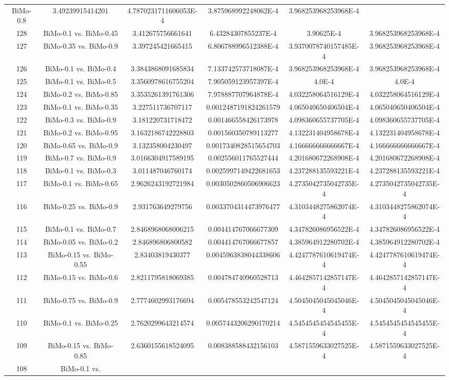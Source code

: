 \documentclass[a4paper,10pt]{article}
\begin{document}
\begin{landscape}
\begin{table}[!htp]
\begin{tabular}{cccccc}
BiMo-0.8&3.49239915414201&4.7870231711606053E-4&3.875968992248062E-4&3.968253968253968E-4\\128&BiMo-0.1 vs. BiMo-0.45&3.412675756661641&6.43284307855237E-4&3.90625E-4&3.968253968253968E-4\\127&BiMo-0.35 vs. BiMo-0.9&3.397245421665415&6.806788996512388E-4&3.9370078740157485E-4&3.968253968253968E-4\\126&BiMo-0.1 vs. BiMo-0.4&3.3843868091685834&7.133742573718087E-4&3.968253968253968E-4&3.968253968253968E-4\\125&BiMo-0.1 vs. BiMo-0.5&3.3560978616755204&7.905059123957397E-4&4.0E-4&4.0E-4\\124&BiMo-0.2 vs. BiMo-0.85&3.3535261391761306&7.978887707964878E-4&4.032258064516129E-4&4.032258064516129E-4\\123&BiMo-0.1 vs. BiMo-0.35&3.227511736707117&0.0012487191824261579&4.065040650406504E-4&4.065040650406504E-4\\122&BiMo-0.3 vs. BiMo-0.9&3.181220731718472&0.001466558426173978&4.098360655737705E-4&4.098360655737705E-4\\121&BiMo-0.2 vs. BiMo-0.95&3.1632186742228803&0.001560350789113277&4.132231404958678E-4&4.132231404958678E-4\\120&BiMo-0.65 vs. BiMo-0.9&3.132358004230497&0.0017340828515654703&4.166666666666667E-4&4.166666666666667E-4\\119&BiMo-0.7 vs. BiMo-0.9&3.0166304917589195&0.002556011765527444&4.201680672268908E-4&4.201680672268908E-4\\118&BiMo-0.1 vs. BiMo-0.3&3.011487046760174&0.0025997149422681653&4.237288135593221E-4&4.237288135593221E-4\\117&BiMo-0.1 vs. BiMo-0.65&2.9626243192721984&0.0030502860506906623&4.2735042735042735E-4&4.2735042735042735E-4\\116&BiMo-0.25 vs. BiMo-0.9&2.931763649279756&0.0033704314473976477&4.3103448275862074E-4&4.3103448275862074E-4\\115&BiMo-0.1 vs. BiMo-0.7&2.8468968068006215&0.004414767066677309&4.347826086956522E-4&4.347826086956522E-4\\114&BiMo-0.05 vs. BiMo-0.2&2.846896806800582&0.004414767066677857&4.385964912280702E-4&4.385964912280702E-4\\113&BiMo-0.15 vs. BiMo-0.55&2.83403819430377&0.0045963838044338606&4.4247787610619474E-4&4.4247787610619474E-4\\112&BiMo-0.15 vs. BiMo-0.6&2.8211795818069385&0.004784740960528713&4.4642857142857147E-4&4.4642857142857147E-4\\111&BiMo-0.75 vs. BiMo-0.9&2.7774602993176694&0.005478553242547124&4.5045045045045046E-4&4.5045045045045046E-4\\110&BiMo-0.1 vs. BiMo-0.25&2.7620299643214574&0.0057443206290170214&4.5454545454545455E-4&4.5454545454545455E-4\\109&BiMo-0.15 vs. BiMo-0.85&2.6360155618524095&0.008388588432156103&4.5871559633027525E-4&4.5871559633027525E-4\\108&BiMo-0.1 vs. 
\end{tabular}
\end{table}
\end{landscape}
\end{document}
